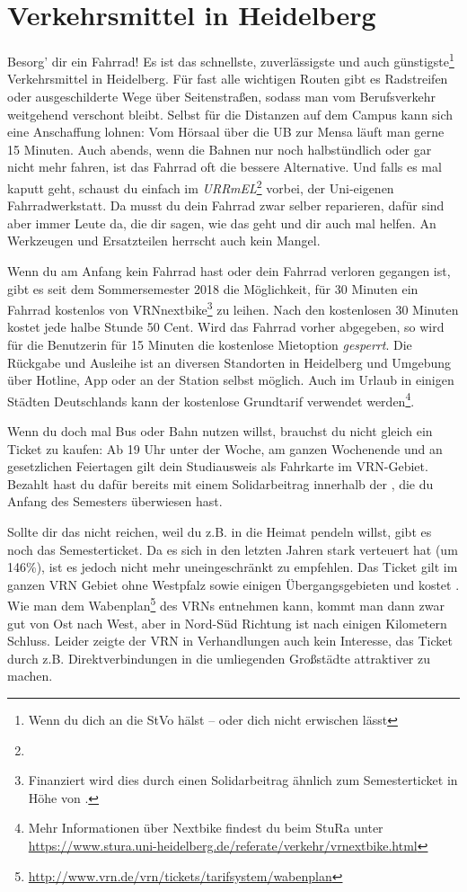 \section{Verkehrsmittel in Heidelberg}
\label{verkehrsmittel}

Besorg' dir ein Fahrrad! Es ist das schnellste, zuverlässigste und auch günstigste\footnote{Wenn du dich an die StVo hälst -- oder dich nicht erwischen lässt} Verkehrsmittel in Heidelberg. Für fast alle wichtigen Routen gibt es Radstreifen oder ausgeschilderte Wege über Seitenstraßen, sodass man vom Berufsverkehr weitgehend verschont bleibt. Selbst für die Distanzen auf dem Campus kann sich eine Anschaffung lohnen: Vom Hörsaal über die \gls{UB} zur Mensa läuft man gerne 15 Minuten. Auch abends, wenn die Bahnen nur noch halbstündlich oder gar nicht mehr fahren, ist das Fahrrad oft die bessere Alternative. Und falls es mal kaputt geht, schaust du einfach im \emph{URRmEL}\footnote{\urrmelOeff} vorbei, der Uni-eigenen Fahrradwerkstatt. Da musst du dein Fahrrad zwar selber reparieren, dafür sind aber immer Leute da, die dir sagen, wie das geht und dir auch mal helfen. An Werkzeugen und Ersatzteilen herrscht auch kein Mangel.

\label{nextbike}
Wenn du am Anfang kein Fahrrad hast oder dein Fahrrad verloren gegangen ist, gibt es seit dem Sommersemester 2018 die Möglichkeit, für 30 Minuten ein Fahrrad kostenlos von VRNnextbike\footnote{Finanziert wird dies durch einen Solidarbeitrag ähnlich zum Semesterticket in Höhe von .} zu leihen. Nach den kostenlosen 30 Minuten kostet jede halbe Stunde 50 Cent. Wird das Fahrrad vorher abgegeben, so wird für die Benutzerin für 15 Minuten die kostenlose Mietoption \emph{gesperrt}. Die Rückgabe und Ausleihe ist an diversen Standorten in Heidelberg und Umgebung über Hotline, App oder an der Station selbst möglich. Auch im Urlaub in einigen Städten Deutschlands kann der kostenlose Grundtarif verwendet werden\footnote{Mehr Informationen über Nextbike findest du beim StuRa unter \url{https://www.stura.uni-heidelberg.de/referate/verkehr/vrnextbike.html}}.

Wenn du doch mal Bus oder Bahn nutzen willst, brauchst du nicht gleich ein Ticket zu kaufen: Ab 19 Uhr unter der Woche, am ganzen Wochenende und an gesetzlichen Feiertagen gilt dein Studiausweis als Fahrkarte im VRN-Gebiet. Bezahlt hast du dafür bereits mit einem Solidarbeitrag innerhalb der \EUR{\beitragssumme}, die du Anfang des Semesters überwiesen hast.

Sollte dir das nicht reichen, weil du z.B. in die Heimat pendeln willst, gibt es noch das Semesterticket. Da es sich in den letzten Jahren stark verteuert hat (um 146\%), ist es jedoch nicht mehr uneingeschränkt zu empfehlen. Das Ticket gilt im ganzen VRN Gebiet ohne Westpfalz sowie einigen Übergangsgebieten und kostet \EUR{\semesterticket}. Wie man dem Wabenplan\footnote{\url{http://www.vrn.de/vrn/tickets/tarifsystem/wabenplan}} des \glspl{VRN} entnehmen kann, kommt man dann zwar gut von Ost nach West, aber in Nord-Süd Richtung ist nach einigen Kilometern Schluss. Leider zeigte der \gls{VRN} in Verhandlungen auch kein Interesse, das Ticket durch z.B. Direktverbindungen in die umliegenden Großstädte attraktiver zu machen.

